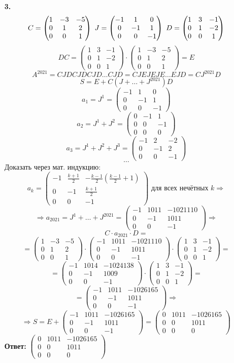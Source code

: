 \documentclass[a4paper]{article}
\newcommand{\mat}[1]{\begin{pmatrix} #1 \end{pmatrix}}
\renewcommand{\f}[2]{\frac{#1}{#2}}
\newcommand{\ts}{\text{\space}}
\renewcommand{\r}{\Rightarrow}
\begin{document}
\begin{enumerate}
    \item[\textbf{3.}]
    $$C = \mat{1 & -3 & -5 \\ 0 & 1 &2 \\ 0 & 0 & 1}\ts 
    J = \mat{-1 & 1 & 0 \\ 0 & -1 & 1 \\ 0 & 0 & -1} \ts 
    D = \mat{1 & 3 & -1 \\ 0 & 1 & -2 \\ 0 & 0 & 1}$$
    $$DC = \mat{1 & 3 & -1 \\ 0 & 1 & -2 \\ 0 & 0 & 1} \cdot \mat{1 & -3 & -5 \\ 0 & 1 &2 \\ 0 & 0 & 1} = E$$
    $$A^{2021} = CJDCJDCJD\dots CJD = CJEJEJE \dots EJD = CJ^{2021}D$$
    $$S = E + C(J+\dots+J^{2021})D$$
    $$a_1 = J^1 = \mat{-1 & 1 & 0 \\ 0 & -1 & 1 \\ 0 & 0 & -1}$$
    $$a_2 = J^1 + J^2 = \mat{0 & -1 & 1 \\ 0 & 0 & -1 \\ 0 & 0 & 0}$$
    $$a_3 = J^1 + J^2 + J^3 = \mat{-1 & 2 & -2 \\ 0 & -1 & 2 \\ 0 & 0 & -1}$$
    $$\dots$$
    Доказать через мат. индукцию:
    $$a_k = \mat{-1 & \f{k+1}{2} & -\f{k-1}{2}(\f{k-1}{2}+1) \\ 0 & -1 & \f{k+1}{2} \\ 0 & 0 & -1} \text{ для всех нечётных } k \r $$
    $$\r a_{2021} = J^1 + \dots + J^{2021} = \mat{-1 & 1011 & -1021110 \\ 0 & -1 & 1011 \\ 0 & 0 & -1} \r$$
    $$ C\cdot a_{2021}\cdot D =$$
    $$= \mat{1 & -3 & -5 \\ 0 & 1 &2 \\ 0 & 0 & 1} \cdot \mat{-1 & 1011 & -1021110 \\ 0 & -1 & 1011 \\ 0 & 0 & -1} \cdot \mat{1 & 3 & -1 \\ 0 & 1 & -2 \\ 0 & 0 & 1} =$$
    $$=\mat{-1 & 1014 & -1024138 \\ 0 & -1 & 1009 \\ 0 & 0 & -1}\cdot \mat{1 & 3 & -1 \\ 0 & 1 & -2 \\ 0 & 0 & 1} =$$
    $$=\mat{-1 & 1011 & -1026165 \\ 0 & -1 & 1011 \\ 0 & 0 & -1} \r $$
    $$\r S = E + \mat{-1 & 1011 & -1026165 \\ 0 & -1 & 1011 \\ 0 & 0 & -1} = \mat{0 & 1011 & -1026165 \\ 0 & 0 & 1011 \\ 0 & 0 & 0}$$
    \textbf{Ответ: } $\mat{0 & 1011 & -1026165 \\ 0 & 0 & 1011 \\ 0 & 0 & 0}$


\end{enumerate}
\end{document}
